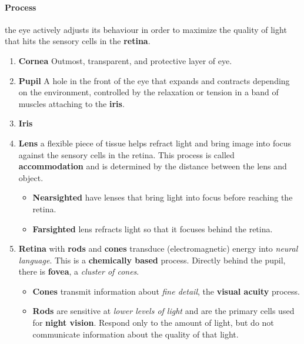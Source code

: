 \documentclass{article}
\begin{document}
	\paragraph{Process} the eye actively adjusts its behaviour in order to maximize the quality of light that hits the sensory cells in the \textbf{retina}.
	\begin{enumerate}
		\item \textbf{Cornea} Outmost, transparent, and protective layer of eye.
		\item \textbf{Pupil} A hole in the front of the eye that expands and contracts depending on the environment, controlled by the relaxation or tension in a band of muscles attaching to the \textbf{iris}.
		\item \textbf{Iris}
		\item \textbf{Lens} a flexible piece of tissue helps refract light and bring image into focus against the sensory cells in the retina. This process is called \textbf{accommodation} and is determined by the distance between the lens and object.
		\begin{itemize}
			\item \textbf{Nearsighted} have lenses that bring light into focus before reaching the retina.
			\item \textbf{Farsighted} lens refracts light so that it focuses behind the retina.
		\end{itemize}
		\item \textbf{Retina} with \textbf{rods} and \textbf{cones} transduce (electromagnetic) energy into \emph{neural language}. This is a \textbf{chemically based} process. Directly behind the pupil, there is \textbf{fovea}, a \emph{cluster of cones}.
		\begin{itemize}
			\item \textbf{Cones} transmit information about \emph{fine detail}, the \textbf{visual acuity} process.
			\item \textbf{Rods} are sensitive at \emph{lower levels of light} and are the primary cells used for \textbf{night vision}. Respond only to the amount of light, but do not communicate information about the quality of that light.
		\end{itemize}
	\end{enumerate}
\end{document}
